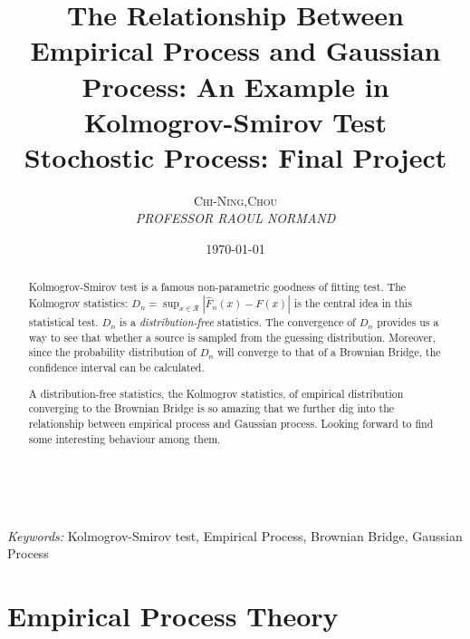 \documentclass[a4paper, 11pt]{article} %
\title{\textbf{The Relationship Between\\
Empirical Process and Gaussian Process: An Example in Kolmogrov-Smirov Test}\\ %
Stochostic Process: Final Project} %
\author{\textsc{Chi-Ning,Chou} %
\\{\textit{PROFESSOR RAOUL NORMAND }}} %
\date{\today} %
\makeatletter
\renewcommand{\maketitle}{ %
\begin{flushright} %
{\LARGE\@title} %

\vspace{50pt} %

{\large\@author} %
\\\@date %

\vspace{40pt} %
\end{flushright}
}
\makeatother
\begin{document}
\maketitle %



\begin{abstract}
Kolmogrov-Smirov test is a famous non-parametric goodness of fitting test. The Kolmogrov statistics: $D_n = \sup_{x\in \mathcal{R}}|\hat{F}_n(x)-F(x)|$ is the central idea in this statistical test. $D_n$ is a {\it distribution-free} statistics. The convergence of $D_n$ provides us a way to see that whether a source is sampled from the guessing distribution. Moreover, since the probability distribution of $D_n$ will converge to that of a Brownian Bridge, the confidence interval can be calculated.

A distribution-free statistics, the Kolmogrov statistics, of empirical distribution converging to the Brownian Bridge is so amazing that we further dig into the relationship between empirical process and Gaussian process. Looking forward to find some interesting behaviour among them.
\end{abstract}

\hspace*{5,6mm}\textit{Keywords:} Kolmogrov-Smirov test, Empirical Process, Brownian Bridge, Gaussian Process %

\vspace{30pt} %


\tableofcontents
\setcounter{tocdepth}{1}

\section{Empirical Process Theory}

\end{document}

